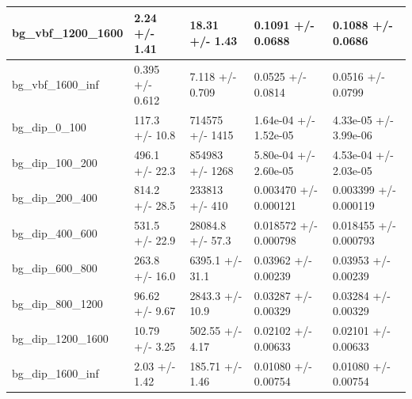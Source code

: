 \documentclass[a4paper, 10pt]{article}
\begin{document}
\begin{table}[H]
\begin{center}
\begin{tabular}{|m{20.0mm}|m{27.0mm}|m{27.0mm}|m{33.0mm}|m{32.0mm}|}
      \hline
      {\cellcolor{white}         bg\_vbf\_1200\_1600}& {\cellcolor{white}         2.24 +/\-- 1.41}& {\cellcolor{white}         18.31 +/\-- 1.43}& {\cellcolor{white}         0.1091 +/\-- 0.0688}& {\cellcolor{white}         0.1088 +/\-- 0.0686}\\
      \hline
      {\cellcolor{white}         bg\_vbf\_1600\_inf}& {\cellcolor{white}         0.395 +/\-- 0.612}& {\cellcolor{white}         7.118 +/\-- 0.709}& {\cellcolor{white}         0.0525 +/\-- 0.0814}& {\cellcolor{white}         0.0516 +/\-- 0.0799}\\
      \hline
      {\cellcolor{white}         bg\_dip\_0\_100}& {\cellcolor{white}         117.3 +/\-- 10.8}& {\cellcolor{white}         714575 +/\-- 1415}& {\cellcolor{white}         1.64e-04 +/\-- 1.52e-05}& {\cellcolor{white}         4.33e-05 +/\-- 3.99e-06}\\
      \hline
      {\cellcolor{white}         bg\_dip\_100\_200}& {\cellcolor{white}         496.1 +/\-- 22.3}& {\cellcolor{white}         854983 +/\-- 1268}& {\cellcolor{white}         5.80e-04 +/\-- 2.60e-05}& {\cellcolor{white}         4.53e-04 +/\-- 2.03e-05}\\
      \hline
      {\cellcolor{white}         bg\_dip\_200\_400}& {\cellcolor{white}         814.2 +/\-- 28.5}& {\cellcolor{white}         233813 +/\-- 410}& {\cellcolor{white}         0.003470 +/\-- 0.000121}& {\cellcolor{white}         0.003399 +/\-- 0.000119}\\
      \hline
      {\cellcolor{white}         bg\_dip\_400\_600}& {\cellcolor{white}         531.5 +/\-- 22.9}& {\cellcolor{white}         28084.8 +/\-- 57.3}& {\cellcolor{white}         0.018572 +/\-- 0.000798}& {\cellcolor{white}         0.018455 +/\-- 0.000793}\\
      \hline
      {\cellcolor{white}         bg\_dip\_600\_800}& {\cellcolor{white}         263.8 +/\-- 16.0}& {\cellcolor{white}         6395.1 +/\-- 31.1}& {\cellcolor{white}         0.03962 +/\-- 0.00239}& {\cellcolor{white}         0.03953 +/\-- 0.00239}\\
      \hline
      {\cellcolor{white}         bg\_dip\_800\_1200}& {\cellcolor{white}         96.62 +/\-- 9.67}& {\cellcolor{white}         2843.3 +/\-- 10.9}& {\cellcolor{white}         0.03287 +/\-- 0.00329}& {\cellcolor{white}         0.03284 +/\-- 0.00329}\\
      \hline
      {\cellcolor{white}         bg\_dip\_1200\_1600}& {\cellcolor{white}         10.79 +/\-- 3.25}& {\cellcolor{white}         502.55 +/\-- 4.17}& {\cellcolor{white}         0.02102 +/\-- 0.00633}& {\cellcolor{white}         0.02101 +/\-- 0.00633}\\
      \hline
      {\cellcolor{white}         bg\_dip\_1600\_inf}& {\cellcolor{white}         2.03 +/\-- 1.42}& {\cellcolor{white}         185.71 +/\-- 1.46}& {\cellcolor{white}         0.01080 +/\-- 0.00754}& {\cellcolor{white}         0.01080 +/\-- 0.00754}\\
\hline
    \end{tabular}
  \end{center}
\end{table}
\end{document}
